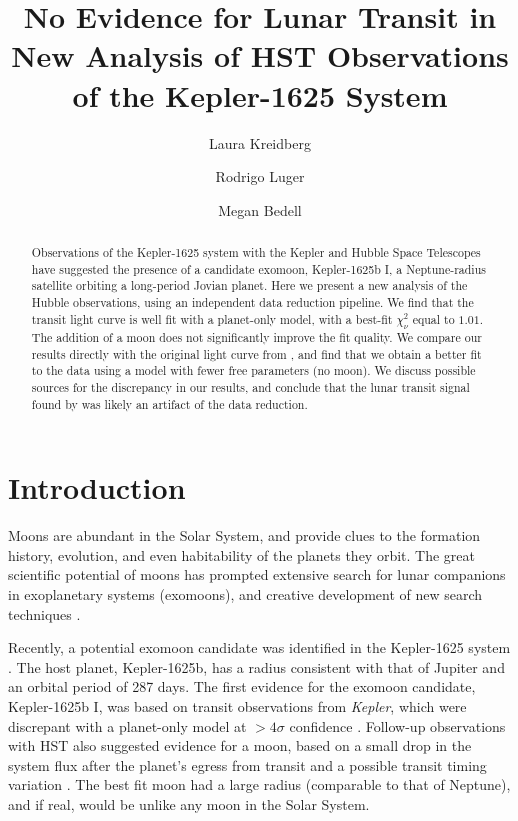 \documentclass[twocolumn]{aastex62}
\newcommand{\project}[1]{\textsl{#1}}
\newcommand{\Kepler}{\project{Kepler}}
\begin{document}
\title{No Evidence for Lunar Transit in New Analysis of HST Observations of the Kepler-1625 System}

\author{Laura Kreidberg}
\author{Rodrigo Luger}
\author{Megan Bedell}

\begin{abstract}
    Observations of the Kepler-1625 system with the Kepler and Hubble Space Telescopes have suggested the presence of a candidate exomoon, Kepler-1625b I, a Neptune-radius satellite orbiting a long-period Jovian planet. Here we present a new analysis of the Hubble observations, using an independent data reduction pipeline. We find that the transit light curve is well fit with a planet-only model, with a best-fit $\chi^2_\nu$ equal to $1.01$. The addition of a moon does not significantly improve the fit quality. We compare our results directly with the original light curve from \cite{teachey18b}, and find that we obtain a better fit to the data using a model with fewer free parameters (no moon).  We discuss possible sources for the discrepancy in our results, and conclude that the lunar transit signal found by \cite{teachey18b} was likely an artifact of the data reduction. 
\end{abstract}


\section{Introduction} \label{sec:intro}
Moons are abundant in the Solar System, and provide clues to the formation history, evolution, and even habitability of the planets they orbit. The great scientific potential of moons has prompted extensive search for lunar companions in exoplanetary systems (exomoons), and creative development of new search techniques \citep[e.g.][]{kipping09a, kipping09b, kipping13, simon10, peters13, heller14, noyola14, hippke15, agol15, sengupta16,  vanderburg18}. 

Recently, a potential exomoon candidate was identified in the Kepler-1625 system \citep{teachey18a}. The host planet, Kepler-1625b, has a radius consistent with that of Jupiter and an orbital period of 287 days.  The first evidence for the exomoon candidate, Kepler-1625b I, was based on transit observations from \Kepler, which were discrepant with a planet-only model at $>4\sigma$ confidence \citep{teachey18a}. Follow-up observations with HST also suggested evidence for a moon, based on a small drop in the system flux after the planet's egress from transit and a possible transit timing variation \citep[][ hereafter TK18]{teachey18b}. The best fit moon had a large radius (comparable to that of Neptune), and if real, would be unlike any moon in the Solar System.
\end{document}

